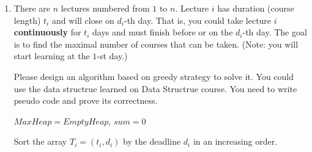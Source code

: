 \documentclass[12pt,a4paper]{article}
\theoremstyle{definition}
\begin{document}
\begin{enumerate}
    \begin{proof}
      Tim's algorithm is right, we can proof it by assuming it is not optimal.
      
      We define the job sequence in Tim's algorithm $T = {T_1, T_2, ..., T_k}$, and the sequence of the optimal method is $R = {R_1, R_2, ..., R_o}$, and r is the largest number that $R_i = T_i, i \in \{1, 2, ..., r\}$ and $R_{r+1} \neq T_{r+1}$, where $T_i$ is a tuple with $T_i[0]$ is the start time and $T_i[1]$ the 
      end time.
      
      Since in Tim's algorithm, $T_i[0] > T_j[0]$ for $i < j$. So we have $T_i[0] < R_i[0]$. If we replace $R_{r+1}$ with $T_{r+1}$ in the optimal result, it actually doesn't influence the rest arrangement 
      $R_{r+2}, R_{r+3}, ..., R_o$. And this is contradictory with the definition of $r$. In that way, Tim got the right algorithm. m
    \end{proof}

    \item
    There are $n$ lectures numbered from $1$ to $n$. Lecture $i$ has duration (course length) $t_i$ and will close on $d_i$-th day. That is, you could take lecture $i$ \textbf{continuously} for $t_i$ days and must finish before or on the $d_i$-th day. The goal is to find the maximal number of courses that can be taken. (Note: you will start learning at the $1$-st day.)
    
    Please design an algorithm based on greedy strategy to solve it. You could use the data structrue learned on Data Structrue course. You need to write pseudo code and prove its correctness.
   
    \begin{minipage}[t]{0.80\textwidth}
   \begin{algorithm}[H]
       $MaxHeap = Empty Heap$, $sum = 0$
       
       Sort the array $T_i=(t_i, d_i)$ by the deadline $d_i$ in an increasing order.

\end{algorithm}
\end{minipage}
\end{enumerate}
\end{document}
